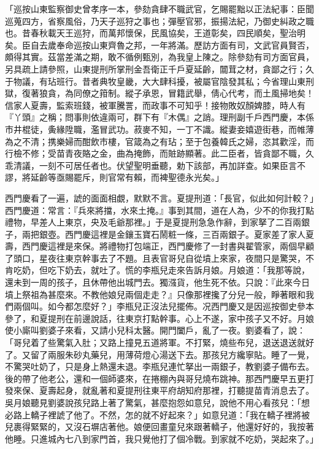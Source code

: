 「巡按山東監察御史曾孝序一本，參劾貪肆不職武官，乞賜罷黜以正法紀事：臣聞巡蒐四方，省察風俗，乃天子巡狩之事也；彈壓官邪，振揚法紀，乃御史糾政之職也。昔春秋載天王巡狩，而萬邦懷保，民風協矣，王道彰矣，四民順矣，聖治明矣。臣自去歲奉命巡按山東齊魯之邦，一年將滿。歷訪方面有司，文武官員賢否，頗得其實。茲當差滿之期，敢不循例甄別，為我皇上陳之。除參劾有司方面官員，另具疏上請參照，山東提刑所掌刑金吾衛正千戶夏延齡，闒茸之材，貪鄙之行；久于物議，有玷班行。昔者典牧皇畿，大大肆科擾，被屬官陰發其私；今省理山東刑獄，復著狼貪，為同僚之箝制。縱子承恩，冒籍武舉，倩心代考，而土風掃地矣！信家人夏壽，監索班錢，被軍騰詈，而政事不可知乎！接物敗奴顏婢膝，時人有『丫頭』之稱；問事則依違兩可，群下有『木偶』之誚。理刑副千戶西門慶，本係市井棍徒，夤緣陞職，濫冒武功。菽麥不知，一丁不識。縱妻妾嬉遊街巷，而帷薄為之不清；携樂婦而酣飲市樓，官箴為之有玷；至于包養韓氏之婦，恣其歡淫，而行檢不修；受苗青夜賂之金，曲為掩飾，而賍跡顯著。此二臣者，皆貪鄙不職，久乖清議，一刻不可居任者也。伏望聖明垂聽，勅下該部，再加詳查。如果臣言不謬，將延齡等亟賜罷斥，則官常有賴，而裨聖德永光矣。」

西門慶看了一遍，諕的面面相覷，默默不言。夏提刑道：「長官，似此如何計較？」西門慶道：常言：『兵來將擋，水來土掩。』事到其間，道在人為，少不的你我打點禮物，早差人上東京，央及毛爺那裡。」于是夏提刑急急作辭，到家拏了二百兩銀子，兩把銀壺。西門慶這裡是金鑲玉寶石鬧粧一條，三百兩銀子。夏家差了家人夏壽，西門慶這裡是來保。將禮物打包端正，西門慶修了一封書與翟管家，兩個早顧了頭口，星夜往東京幹事去了不題。且表官哥兒自從墳上來家，夜間只是驚哭，不肯吃奶，但吃下奶去，就吐了。慌的李瓶兒走來告訴月娘。月娘道：「我那等說，還未到一周的孩子，且休帶他出城門去。獨漒貨，他生死不依。只說：『此來今日墳上祭祖為甚麼來。不教他娘兒兩個走走？』只像那裡攙了分兒一般，睜著眼和我們兩個叫。如今都怎麼好？」李瓶兒正沒法兒擺佈。况西門慶又是因巡按御史參本參了，和夏提刑在前邊說話，往東京打點幹事。心上不遂，家中孩子又不好。月娘使小廝叫劉婆子來看，又請小兒科太醫。開門闔戶，亂了一夜。劉婆看了，說：「哥兒着了些驚氣入肚；又路上撞見五道將軍。不打緊，燒些布兒，退送退送就好了。又留了兩服朱砂丸藥兒，用薄荷燈心湯送下去。那孩兒方纔寧貼。睡了一覺，不驚哭吐奶了，只是身上熱還未退。李瓶兒連忙拏出一兩銀子，教劉婆子備布去。後的帶了他老公，還和一個師婆來，在捲棚內與哥兒燒布跳神。那西門慶早五更打發來保、夏壽起身，就亂著和夏提刑往東平府胡知府那裡，打聽提苗青消息去了。吳月娘聽見劉婆說孩兒路上著了驚氣，甚麼抱怨如意兒，說他不用心看孩兒：「想必路上轎子裡諕了他了。不然，怎的就不好起來？」如意兒道：「我在轎子裡將被兒裹得緊緊的，又沒石塀店著他。娘便回畫童兒來跟著轎子，他還好好的，我按著他睡。只進城內七八到家門首，我只覺他打了個冷戰。到家就不吃奶，哭起來了。」

